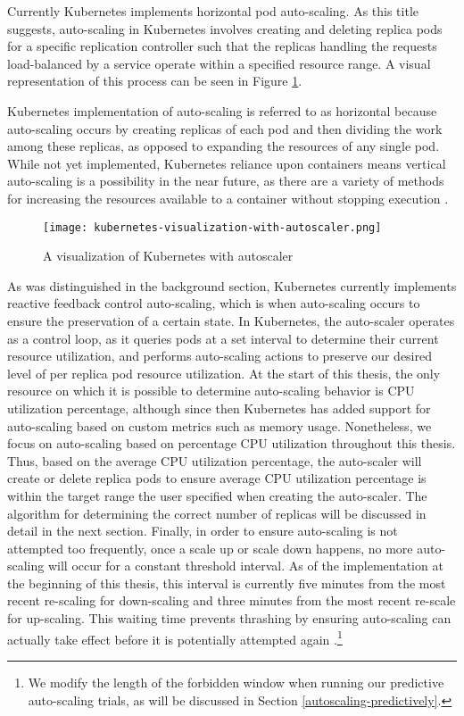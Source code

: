 Currently Kubernetes implements horizontal pod auto-scaling.
As this title suggests, auto-scaling in
Kubernetes involves creating and deleting replica pods for a specific replication
controller such that the replicas handling the requests load-balanced by a service
operate within a specified resource range. A visual representation of this
process can be seen in Figure \ref{fig:kubernetes-visualization-with-autoscaler}.

Kubernetes implementation of auto-scaling is referred to as horizontal because
auto-scaling occurs by creating replicas of each pod and then dividing the work
among these replicas, as opposed to expanding the resources of any single pod.
While not yet implemented, Kubernetes reliance upon containers means vertical
auto-scaling is a possibility in the near future, as there are a variety of
methods for increasing the resources available to a container without stopping
execution \cite{docker-up-and-running}.

\begin{figure}[!h]
  \centerline{\texttt{[image: kubernetes-visualization-with-autoscaler.png]}}
  \caption{A visualization of Kubernetes with autoscaler}
  \label{fig:kubernetes-visualization-with-autoscaler}
\end{figure}

As was distinguished in the background section, Kubernetes currently implements reactive
feedback control auto-scaling, which is when auto-scaling occurs to
ensure the preservation of a certain state.
In Kubernetes, the auto-scaler operates as a control loop,
as it queries pods at a set interval to determine
their current resource utilization, and performs auto-scaling actions to
preserve our desired level of per replica pod resource utilization.
At the start of this thesis, the only resource on which it is possible to
determine auto-scaling behavior is CPU utilization percentage, although since
then Kubernetes has added support for auto-scaling based on custom metrics such
as memory usage. Nonetheless, we focus on auto-scaling based on percentage CPU
utilization throughout this thesis.
Thus, based on the average CPU utilization percentage, the
auto-scaler will create or delete replica pods to ensure average CPU utilization
percentage is within the target range the user specified when creating the
auto-scaler. The algorithm for determining the correct number of replicas
will be discussed in detail in the next section. Finally,
in order to ensure auto-scaling is not attempted too frequently, once a
scale up or scale down happens, no more auto-scaling will occur for a constant
threshold interval. As of the implementation at the beginning of this thesis,
this interval is currently five minutes from the most recent
re-scaling for down-scaling and three minutes from the most recent re-scale for
up-scaling. This waiting time prevents thrashing by ensuring
auto-scaling can actually take effect before it is potentially attempted again
\cite{k8s-horizontal-pod-autoscaler-user-guide}.\footnote{We modify the length
of the forbidden window when running our predictive auto-scaling trials, as will
be discussed in Section \ref{autoscaling-predictively}.}
